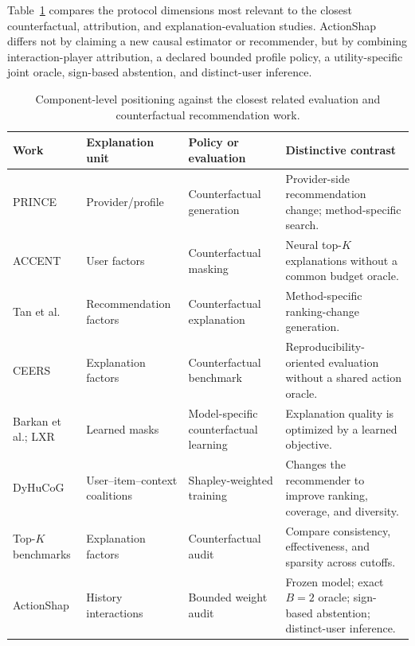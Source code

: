 \documentclass[pdflatex,sn-mathphys-num]{sn-jnl}
\begin{document}
Table~\ref{tab:related-work-comparison} compares the protocol dimensions most relevant to the closest counterfactual, attribution, and explanation-evaluation studies. ActionShap differs not by claiming a new causal estimator or recommender, but by combining interaction-player attribution, a declared bounded profile policy, a utility-specific joint oracle, sign-based abstention, and distinct-user inference.

\begin{table}[t]
\centering\scriptsize
\caption{Component-level positioning against the closest related evaluation and counterfactual recommendation work.}
\label{tab:related-work-comparison}
\setlength{\tabcolsep}{3pt}
\begin{tabular}{@{}p{}p{}p{}p{}@{}}
\toprule
Work & Explanation unit & Policy or evaluation & Distinctive contrast \\
\midrule
PRINCE \cite{ghazimatin2020} & Provider/profile & Counterfactual generation & Provider-side recommendation change; method-specific search. \\
ACCENT \cite{tran2021} & User factors & Counterfactual masking & Neural top-$K$ explanations without a common budget oracle. \\
Tan et al. \cite{tan2021} & Recommendation factors & Counterfactual explanation & Method-specific ranking-change generation. \\
CEERS \cite{baklanov2024} & Explanation factors & Counterfactual benchmark & Reproducibility-oriented evaluation without a shared action oracle. \\
Barkan et al.; LXR \cite{barkan2024,gurevitch2025} & Learned masks & Model-specific counterfactual learning & Explanation quality is optimized by a learned objective. \\
DyHuCoG \cite{louhichi2026dyhucog} & User--item--context coalitions & Shapley-weighted training & Changes the recommender to improve ranking, coverage, and diversity. \\
Top-$K$ benchmarks \cite{mohammadi2025,nguyen2026} & Explanation factors & Counterfactual audit & Compare consistency, effectiveness, and sparsity across cutoffs. \\
ActionShap & History interactions & Bounded weight audit & Frozen model; exact $B=2$ oracle; sign-based abstention; distinct-user inference. \\
\bottomrule
\end{tabular}
\end{table}
\end{document}
